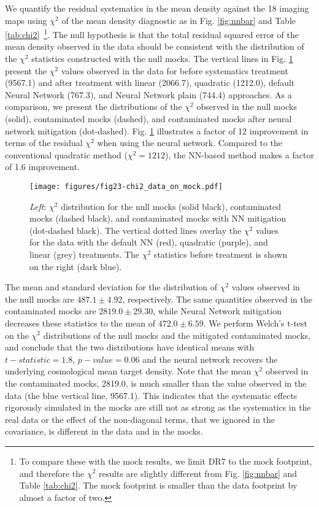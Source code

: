 We quantify the residual systematics in the mean density against the 18 imaging maps using $\chi^2$ of the mean density diagnostic as in Fig. \ref{fig:nnbar} and Table \ref{tab:chi2}~\footnote{To compare these with the mock results, we limit DR7 to the mock footprint, and therefore the $\chi^2$ results are slightly different from Fig. \ref{fig:nnbar} and Table \ref{tab:chi2}. The mock footprint is smaller than the data footprint by almost a factor of two.}. The null hypothesis is that the total residual squared error of the mean density observed in the data should be consistent with the distribution of the $\chi^{2}$ statistics constructed with the null mocks. The vertical lines in Fig. \ref{fig:chi2pdf} present the $\chi^{2}$ values observed in the data for before systematics treatment (9567.1) and after treatment with linear (2066.7), quadratic (1212.0), default Neural Network (767.3), and  Neural Network plain (744.4) approaches. As a comparison, we present the distributions of the $\chi^{2}$ observed in the null mocks (solid), contaminated mocks (dashed), and contaminated mocks after neural network mitigation (dot-dashed). Fig. \ref{fig:chi2pdf} illustrates a factor of 12 improvement in terms of the residual $\chi^2$ when using the neural network. Compared to the conventional quadratic method ($\chi^2=1212$), the NN-based method makes a factor of 1.6 improvement.\\

\begin{figure}
    \centering
    \texttt{[image: figures/fig23-chi2\_data\_on\_mock.pdf]}
    \caption{\textit{Left}: $\chi^{2}$ distribution for the null mocks (solid black), contaminated mocks (dashed black), and contaminated mocks with NN mitigation (dot-dashed black). The vertical dotted lines overlay the $\chi^{2}$ values for the data with the default NN (red), quadratic (purple), and linear (grey) treatments. The $\chi^{2}$ statistics before treatment is shown on the right (dark blue).}
    \label{fig:chi2pdf}
\end{figure}

The mean and standard deviation for the distribution of $\chi^{2}$  values observed in the null mocks are $487.1 \pm 4.92$, respectively. The same quantities observed in the contaminated mocks are $2819.0 \pm 29.30$, while Neural Network mitigation decreases these statistics to the mean of $472.0\pm 6.59$. We perform Welch's t-test \citep{welch1947generalization} on the $\chi^{2}$ distributions of the null mocks and the mitigated contaminated mocks, and conclude that the two distributions have identical means with $t-statistic=1.8$, $p-value=0.06$ and the neural network recovers the underlying cosmological mean target density. Note that the mean $\chi^{2}$ observed in the contaminated mocks, 2819.0, is much smaller than the value observed in the data (the blue vertical line, 9567.1). This indicates that the systematic effects rigorously simulated in the mocks are still not as strong as the systematics in the real data or the effect of the non-diagonal terms, that we ignored in the covariance, is different in the data and in the mocks.\\

